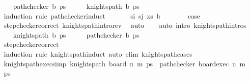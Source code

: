 \begin{isabellebody}
\isadelimproof
%
\endisadelimproof
%
\isatagproof
{}\isamarkupfalse%
\isanewline
\ \ \isamarkupfalse%
\ {\isachardoublequoteopen}path{\isacharunderscore}{\kern0pt}checker\ b\ ps{\isachardoublequoteclose}\isanewline
\ \ \isamarkupfalse%
\ \isamarkupfalse%
\ {\isachardoublequoteopen}knights{\isacharunderscore}{\kern0pt}path\ b\ ps{\isachardoublequoteclose}\isanewline
\ \ \isamarkupfalse%
\ {\isacharparenleft}{\kern0pt}induction\ rule{\isacharcolon}{\kern0pt}\ path{\isacharunderscore}{\kern0pt}checker{\isachardot}{\kern0pt}induct{\isacharparenright}{\kern0pt}\isanewline
\ \ \ \ \isamarkupfalse%
\ {\isacharparenleft}{\kern0pt}{}\ s\isactrlsub i\ s\isactrlsub j\ xs\ b{\isacharparenright}{\kern0pt}\isanewline
\ \ \ \ \isamarkupfalse%
\ \isamarkupfalse%
\ {\isacharquery}{\kern0pt}case\ \isamarkupfalse%
\ step{\isacharunderscore}{\kern0pt}checker{\isacharunderscore}{\kern0pt}correct\ knights{\isacharunderscore}{\kern0pt}path{\isacharunderscore}{\kern0pt}intro{\isacharunderscore}{\kern0pt}rev\ \isamarkupfalse%
\ auto\isanewline
\ \ \isamarkupfalse%
\ {\isacharparenleft}{\kern0pt}auto\ intro{\isacharcolon}{\kern0pt}\ knights{\isacharunderscore}{\kern0pt}path{\isachardot}{\kern0pt}intros{\isacharparenright}{\kern0pt}\isanewline
{}\isamarkupfalse%
\isanewline
\ \ \isamarkupfalse%
\ {\isachardoublequoteopen}knights{\isacharunderscore}{\kern0pt}path\ b\ ps{\isachardoublequoteclose}\isanewline
\ \ \isamarkupfalse%
\ \isamarkupfalse%
\ {\isachardoublequoteopen}path{\isacharunderscore}{\kern0pt}checker\ b\ ps{\isachardoublequoteclose}\ \ \ \ \ \ \ \ \ \ \ \ \ \ \ \ \ \ \isanewline
\ \ \ \ \isamarkupfalse%
\ step{\isacharunderscore}{\kern0pt}checker{\isacharunderscore}{\kern0pt}correct\ \isanewline
\ \ \ \ \isamarkupfalse%
\ {\isacharparenleft}{\kern0pt}induction\ rule{\isacharcolon}{\kern0pt}\ knights{\isacharunderscore}{\kern0pt}path{\isachardot}{\kern0pt}induct{\isacharparenright}{\kern0pt}\ {\isacharparenleft}{\kern0pt}auto\ elim{\isacharcolon}{\kern0pt}\ knights{\isacharunderscore}{\kern0pt}path{\isachardot}{\kern0pt}cases{\isacharparenright}{\kern0pt}\isanewline
{}\isamarkupfalse%
%
\endisatagproof
{\isafoldproof}%
%
\isadelimproof
\isanewline
%
\endisadelimproof
\isanewline
{}\isamarkupfalse%
\ knights{\isacharunderscore}{\kern0pt}path{\isacharunderscore}{\kern0pt}exec{\isacharunderscore}{\kern0pt}simp{\isacharcolon}{\kern0pt}\ {\isachardoublequoteopen}knights{\isacharunderscore}{\kern0pt}path\ {\isacharparenleft}{\kern0pt}board\ n\ m{\isacharparenright}{\kern0pt}\ ps\ {\isasymlongleftrightarrow}\ path{\isacharunderscore}{\kern0pt}checker\ {\isacharparenleft}{\kern0pt}board{\isacharunderscore}{\kern0pt}exec\ n\ m{\isacharparenright}{\kern0pt}\ ps{\isachardoublequoteclose}\isanewline

\end{isabellebody}
